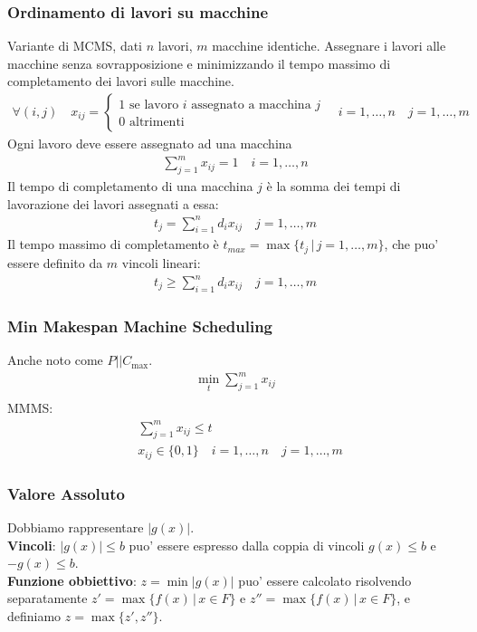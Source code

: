 \documentclass[a4paper,12pt]{article}
\begin{document}
\subsubsection{Ordinamento di lavori su macchine}
Variante di MCMS, dati $n$ lavori, $m$ macchine identiche. Assegnare i lavori alle macchine senza sovrapposizione e minimizzando il tempo massimo di completamento dei lavori sulle macchine.
\begin{align*}
  \forall (i,j) \quad x_{ij} = \begin{cases}
    1 \text{ se lavoro $i$ assegnato a macchina $j$}\\
    0 \text{ altrimenti}
  \end{cases} \quad i=1,\dots,n \quad j=1,\dots,m
\end{align*}
Ogni lavoro deve essere assegnato ad una macchina
\begin{align*}
  \sum_{j=1}^m x_{ij} = 1 \quad i=1,\dots,n
\end{align*}
Il tempo di completamento di una macchina $j$ è la somma dei tempi di lavorazione dei lavori assegnati a essa:
\begin{align*}
  t_j = \sum_{i=1}^n d_i x_{ij} \quad j=1,\dots,m
\end{align*}
Il tempo massimo di completamento è $t_{max} = \max\{t_j \, | \, j=1,\dots,m\}$, che puo' essere definito da $m$ vincoli lineari:
\begin{align*}
  t_j \geq \sum_{i=1}^n d_i x_{ij} \quad j=1,\dots,m
\end{align*}
\subsubsection{Min Makespan Machine Scheduling}
Anche noto come $P || C_{\max}$.
\begin{align*}
  \min_t \sum_{j=1}^m x_{ij} \\
\end{align*}
MMMS:
\begin{align*}
  & \sum_{j=1}^m x_{ij} \leq t\\
  & x_{ij} \in \{0,1\} \quad i=1,\dots,n \quad j=1,\dots,m
\end{align*}
\subsubsection*{Valore Assoluto} 
Dobbiamo rappresentare $|g(x)|$.\\
\textbf{Vincoli}: $|g(x)| \leq b$ puo' essere espresso dalla coppia di vincoli $g(x) \leq b$ e $-g(x) \leq b$.\\
\textbf{Funzione obbiettivo}: $z = \min |g(x)|$ puo' essere calcolato risolvendo separatamente $z' = \max \{f(x) \, | \, x \in F\}$ e $z'' = \max\{f(x) \, | \, x \in F\}$, e definiamo $z = \max\{z', z''\}$.
\end{document}
